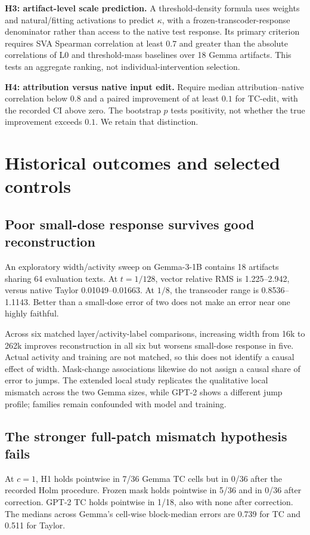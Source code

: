 \textbf{H3: artifact-level scale prediction.} A threshold-density formula uses weights and natural/fitting activations to predict $\kappa$, with a frozen-transcoder-response denominator rather than access to the native test response. Its primary criterion requires SVA Spearman correlation at least $0.7$ and greater than the absolute correlations of L0 and threshold-mass baselines over 18 Gemma artifacts. This tests an aggregate ranking, not individual-intervention selection.

\textbf{H4: attribution versus native input edit.} Require median attribution--native correlation below $0.8$ and a paired improvement of at least $0.1$ for TC-edit, with the recorded CI above zero. The bootstrap $p$ tests positivity, not whether the true improvement exceeds $0.1$. We retain that distinction.

\section{Historical outcomes and selected controls}

\subsection{Poor small-dose response survives good reconstruction}
An exploratory width/activity sweep on Gemma-3-1B contains 18 artifacts sharing 64 evaluation texts. At $t=1/128$, vector relative RMS is 1.225--2.942, versus native Taylor 0.01049--0.01663. At $1/8$, the transcoder range is 0.8536--1.1143. Better than a small-dose error of two does not make an error near one highly faithful.

Across six matched layer/activity-label comparisons, increasing width from 16k to 262k improves reconstruction in all six but worsens small-dose response in five. Actual activity and training are not matched, so this does not identify a causal effect of width. Mask-change associations likewise do not assign a causal share of error to jumps. The extended local study replicates the qualitative local mismatch across the two Gemma sizes, while GPT-2 shows a different jump profile; families remain confounded with model and training.

\subsection{The stronger full-patch mismatch hypothesis fails}
At $c=1$, H1 holds pointwise in 7/36 Gemma TC cells but in 0/36 after the recorded Holm procedure. Frozen mask holds pointwise in 5/36 and in 0/36 after correction. GPT-2 TC holds pointwise in 1/18, also with none after correction. The medians across Gemma's cell-wise block-median errors are 0.739 for TC and 0.511 for Taylor.

